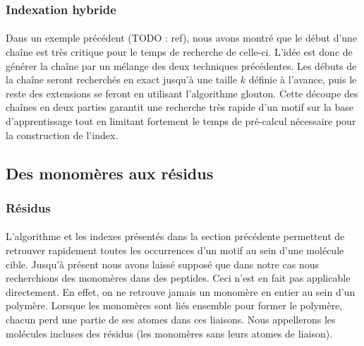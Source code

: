 \documentclass[12pt,french,twoside]{report}
\begin{document}
\subsubsection{Indexation hybride}

\paragraph{}Dans un exemple précédent (TODO : ref), nous avons montré que le début d'une chaîne est très critique pour le temps
de recherche de celle-ci. L'idée est donc de générer la chaîne par un mélange des deux techniques précédentes. Les débuts de la 
chaîne seront recherchés en exact jusqu'à une taille $k$ définie à l'avance, puis le reste des extensions se feront en
utilisant l'algorithme glouton. Cette découpe des chaînes en deux parties garantit une recherche très rapide d'un
motif sur la base d'apprentissage tout en limitant fortement le temps de pré-calcul nécessaire pour la construction de l'index.



\subsection{Des monomères aux résidus}


\subsubsection{Résidus}

\paragraph{}L'algorithme et les indexes présentés dans la section précédente permettent de retrouver rapidement toutes les
occurrences d'un motif au sein d'une molécule cible. Jusqu'à présent nous avons laissé supposé que dans notre cas
nous recherchions des monomères dans des peptides. Ceci n'est en fait pas applicable directement. En effet, on ne retrouve jamais
un monomère en entier au sein d'un polymère. Lorsque les monomères sont liés ensemble pour former le polymère, chacun perd une
partie de ses atomes dans ces liaisons. Nous appellerons les molécules incluses des résidus (les monomères sans leurs atomes de
liaison).
\end{document}
